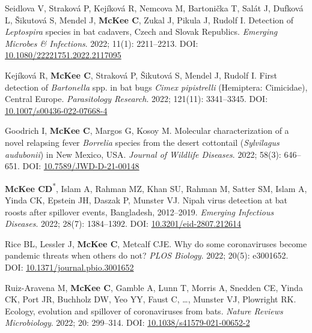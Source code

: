 \documentclass{cv}
\begin{document}
\begin{pubenum}
\item Seidlova V, Straková P, Kejíková R, Nemcova M, Bartonička T, Salát J, Dufková L, Šikutová S, Mendel J, \textbf{McKee C}, Zukal J, Pikula J, Rudolf I. Detection of \textit{Leptospira} species in bat cadavers, Czech and Slovak Republics. \textit{Emerging Microbes \& Infections}. 2022; 11(1): 2211--2213. DOI: \href{https://doi.org/10.1080/22221751.2022.2117095}{10.1080/22221751.2022.2117095}

\item Kejíková R, \textbf{McKee C}, Straková P, Šikutová S, Mendel J, Rudolf I. First detection of \textit{Bartonella} spp. in bat bugs \textit{Cimex pipistrelli} (Hemiptera: Cimicidae), Central Europe. \textit{Parasitology Research}. 2022; 121(11): 3341--3345. DOI: \href{https://doi.org/10.1007/s00436-022-07668-4}{10.1007/s00436-022-07668-4}

\item Goodrich I, \textbf{McKee C}, Margos G, Kosoy M. Molecular characterization of a novel relapsing fever \textit{Borrelia} species from the desert cottontail (\textit{Sylvilagus audubonii}) in New Mexico, USA. \textit{Journal of Wildlife Diseases}. 2022; 58(3): 646--651. DOI: \href{https://doi.org/10.7589/JWD-D-21-00148}{10.7589/JWD-D-21-00148}

\item \textbf{McKee CD}\textsuperscript{*\dag}, Islam A\textsuperscript{\dag}, Rahman MZ, Khan SU, Rahman M, Satter SM, Islam A, Yinda CK, Epstein JH, Daszak P, Munster VJ. Nipah virus detection at bat roosts after spillover events, Bangladesh, 2012--2019. \textit{Emerging Infectious Diseases}. 2022; 28(7): 1384--1392. DOI: \href{https://doi.org/10.3201/eid2807.212614}{10.3201/eid-2807.212614}

\item Rice BL\textsuperscript{\dag}, Lessler J\textsuperscript{\dag}, \textbf{McKee C}\textsuperscript{\dag}, Metcalf CJE\textsuperscript{\dag}. Why do some coronaviruses become pandemic threats when others do not? \textit{PLOS Biology}. 2022; 20(5): e3001652. DOI: \href{https://doi.org/10.1371/journal.pbio.3001652}{10.1371/journal.pbio.3001652}

\item Ruiz-Aravena M\textsuperscript{\dag}, \textbf{McKee C}\textsuperscript{\dag}, Gamble A, Lunn T, Morris A, Snedden CE, Yinda CK, Port JR, Buchholz DW, Yeo YY, Faust C, …, Munster VJ, Plowright RK. Ecology, evolution and spillover of coronaviruses from bats. \textit{Nature Reviews Microbiology}. 2022; 20: 299--314. DOI: \href{https://doi.org/10.1038/s41579-021-00652-2}{10.1038/s41579-021-00652-2}


\end{pubenum}
\end{document}
